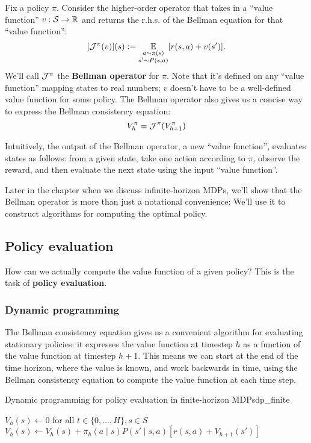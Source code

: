 \documentclass[../main/main]{subfiles}
\begin{document}
Fix a policy $\pi$. Consider the higher-order operator that takes in a ``value function'' $v : \mathcal{S} \to \mathbb{R}$ and returns the r.h.s. of the Bellman equation for that ``value function'':
\[
    [\mathcal{J}^{\pi}(v)](s) := \operatorname*{\mathbb{E}}_{\substack{a \sim \pi(s) \\ s' \sim P(s, a)}} [r(s, a) + v(s')].
\]
We'll call $\mathcal{J}^\pi$ the \textbf{Bellman operator} for $\pi$. Note that it's defined on any ``value function'' mapping states to real numbers; $v$ doesn't have to be a well-defined value function for some policy. The Bellman operator also gives us a concise way to express the Bellman consistency equation:
\[
    V_h^\pi = \mathcal{J}^{\pi}(V_{h+1}^\pi)
\]

Intuitively, the output of the Bellman operator, a new ``value function'', evaluates states as follows: from a given state, take one action according to $\pi$, observe the reward, and then evaluate the next state using the input ``value function''.

Later in the chapter when we discuss infinite-horizon MDPs, we'll show that the Bellman operator is more than just a notational convenience: We'll use it to construct algorithms for computing the optimal policy.

\subsection{Policy evaluation}

How can we actually compute the value function of a given policy? This is the task of \textbf{policy evaluation}.

\subsubsection{Dynamic programming}
\label{sec:dp}

The Bellman consistency equation gives us a convenient algorithm for evaluating stationary policies: it expresses the value function at timestep $h$ as a function of the value function at timestep $h+1$. This means we can start at the end of the time horizon, where the value is known, and work backwards in time, using the Bellman consistency equation to compute the value function at each time step.

\begin{definition}{Dynamic programming for policy evaluation in finite-horizon MDPs}{dp_finite}
    \begin{algorithmic}
\State $V_h(s) \gets 0$ for all $t \in \{ 0, \dots, H \}, s \in S$
        \State $V_h(s) \gets V_h(s) + \pi_h(a \mid s) P(s' \mid s, a) [r(s, a) + V_{h+1}(s')]$
    \EndFor
\EndFor
    \end{algorithmic}
\end{definition}
\end{document}
